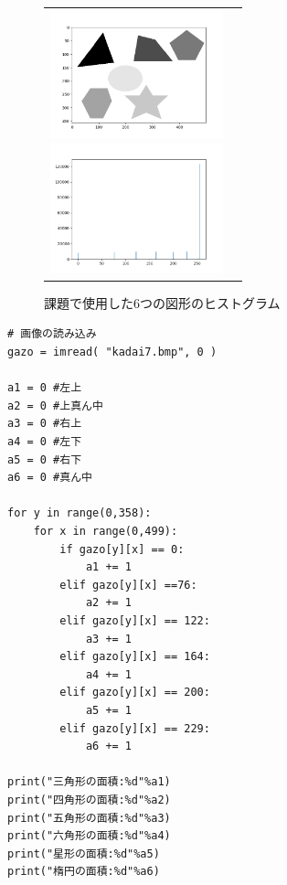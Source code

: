 \documentclass[a4paper,11pt,uplatex, titlepage]{jsarticle}
\begin{document}
\begin{figure}[H]
  \begin{tabular}{cc}
    \begin{minipage}{0.5\hsize}
      \begin{center}
        \includegraphics[width = 5cm]{pic/kadai7_1.png}
        \caption{課題で使用した6つの図形}
        \label{7}
      \end{center}
    \end{minipage}

    \begin{minipage}{0.5\hsize}
      \begin{center}
        \includegraphics[width = 5cm]{pic/kadai7_2.png}
        \caption{課題で使用した6つの図形のヒストグラム}
        \label{7_hist}
      \end{center}
    \end{minipage}
  \end{tabular}
\end{figure}

\begin{lstlisting}[basicstyle=\ttfamily\footnotesize]
# 画像の読み込み
gazo = imread( "kadai7.bmp", 0 )

a1 = 0 #左上
a2 = 0 #上真ん中
a3 = 0 #右上
a4 = 0 #左下
a5 = 0 #右下
a6 = 0 #真ん中

for y in range(0,358):
    for x in range(0,499):
        if gazo[y][x] == 0:
            a1 += 1
        elif gazo[y][x] ==76:
            a2 += 1
        elif gazo[y][x] == 122:
            a3 += 1
        elif gazo[y][x] == 164:
            a4 += 1
        elif gazo[y][x] == 200:
            a5 += 1
        elif gazo[y][x] == 229:
            a6 += 1

print("三角形の面積:%d"%a1)
print("四角形の面積:%d"%a2)
print("五角形の面積:%d"%a3)
print("六角形の面積:%d"%a4)
print("星形の面積:%d"%a5)
print("楕円の面積:%d"%a6)
\end{lstlisting}
\end{document}
